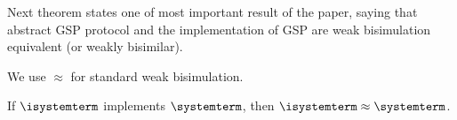\begin{definition}
\begin{enumerate}
	

\end{enumerate}
 
	
	
\end{definition}

Next theorem states one of most important result of the paper, saying that abstract GSP protocol and the implementation of GSP are weak bisimulation equivalent (or weakly bisimilar).

We use $\approx$ for standard weak bisimulation.

\begin{theorem} If  $\isystemterm$ implements $\systemterm$, then $\isystemterm\approx\systemterm$. 
\end{theorem}



